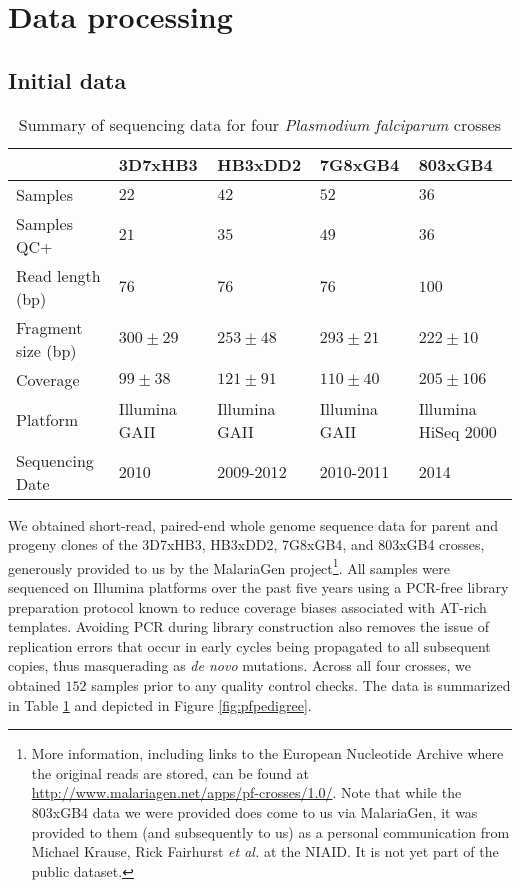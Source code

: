 \section{Data processing}

\subsection{Initial data}

\begin{table}[]
\centering
\caption{Summary of sequencing data for four \textit{Plasmodium falciparum} crosses}
\label{tbl:crosssummary}
\begin{tabular}{@{}lllll@{}}
\toprule
                   & 3D7xHB3       & HB3xDD2       & 7G8xGB4       & 803xGB4             \\ \midrule
Samples            & $22$          & $42$          & $52$          & $36$                \\
Samples QC+        & $21$          & $35$          & $49$          & $36$                \\
Read length (bp)   & $76$          & $76$          & $76$          & $100$               \\
Fragment size (bp) & $300 \pm 29$  & $253 \pm 48$  & $293 \pm 21$  & $222 \pm 10$        \\
Coverage           & $99  \pm 38$  & $121 \pm 91$  & $110 \pm 40$  & $205 \pm 106$       \\
Platform           & Illumina GAII & Illumina GAII & Illumina GAII & Illumina HiSeq 2000 \\
Sequencing Date    & 2010          & 2009-2012     & 2010-2011     & 2014                \\ \bottomrule
\end{tabular}
\end{table}

We obtained short-read, paired-end whole genome sequence data for parent and progeny clones of the 3D7xHB3\cite{Walliker:1987cv}, HB3xDD2\cite{Wellems:1990eg}, 7G8xGB4\cite{Hayton:2008hn}, and 803xGB4 crosses, generously provided to us by the MalariaGen project\footnote{More information, including links to the European Nucleotide Archive where the original reads are stored, can be found at \url{http://www.malariagen.net/apps/pf-crosses/1.0/}.  Note that while the 803xGB4 data we were provided does come to us via MalariaGen, it was provided to them (and subsequently to us) as a personal communication from Michael Krause, Rick Fairhurst \textit{et al.} at the NIAID.  It is not yet part of the public dataset.}.  All samples were sequenced on Illumina platforms over the past five years using a PCR-free library preparation protocol known to reduce coverage biases associated with AT-rich templates.  Avoiding PCR during library construction also removes the issue of replication errors that occur in early cycles being propagated to all subsequent copies, thus masquerading as \textit{de novo} mutations.  Across all four crosses, we obtained $152$ samples prior to any quality control checks.  The data is summarized in Table \ref{tbl:crosssummary} and depicted in Figure \ref{fig:pfpedigree}.

